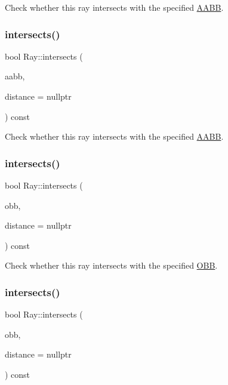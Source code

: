 Check whether this ray intersects with the specified \hyperlink{classAABB}{A\+A\+BB}. \mbox{\label{classRay_a2db2a0a4c6b8f67500d5b8b6542f5d50}} 
\subsubsection{\texorpdfstring{intersects()}{intersects()}\hspace{0.1cm}{\footnotesize\ttfamily [2/4]}}
{\footnotesize\ttfamily bool Ray\+::intersects (\begin{DoxyParamCaption}\item[{const \hyperlink{classAABB}{A\+A\+BB} \&}]{aabb,  }\item[{float $\ast$}]{distance = {\ttfamily nullptr} }\end{DoxyParamCaption}) const}

Check whether this ray intersects with the specified \hyperlink{classAABB}{A\+A\+BB}. \mbox{\label{classRay_a8cab9601415189aa8b138805c1880b12}} 
\subsubsection{\texorpdfstring{intersects()}{intersects()}\hspace{0.1cm}{\footnotesize\ttfamily [3/4]}}
{\footnotesize\ttfamily bool Ray\+::intersects (\begin{DoxyParamCaption}\item[{const \hyperlink{classOBB}{O\+BB} \&}]{obb,  }\item[{float $\ast$}]{distance = {\ttfamily nullptr} }\end{DoxyParamCaption}) const}

Check whether this ray intersects with the specified \hyperlink{classOBB}{O\+BB}. \mbox{\label{classRay_a8cab9601415189aa8b138805c1880b12}} 
\subsubsection{\texorpdfstring{intersects()}{intersects()}\hspace{0.1cm}{\footnotesize\ttfamily [4/4]}}
{\footnotesize\ttfamily bool Ray\+::intersects (\begin{DoxyParamCaption}\item[{const \hyperlink{classOBB}{O\+BB} \&}]{obb,  }\item[{float $\ast$}]{distance = {\ttfamily nullptr} }\end{DoxyParamCaption}) const}

